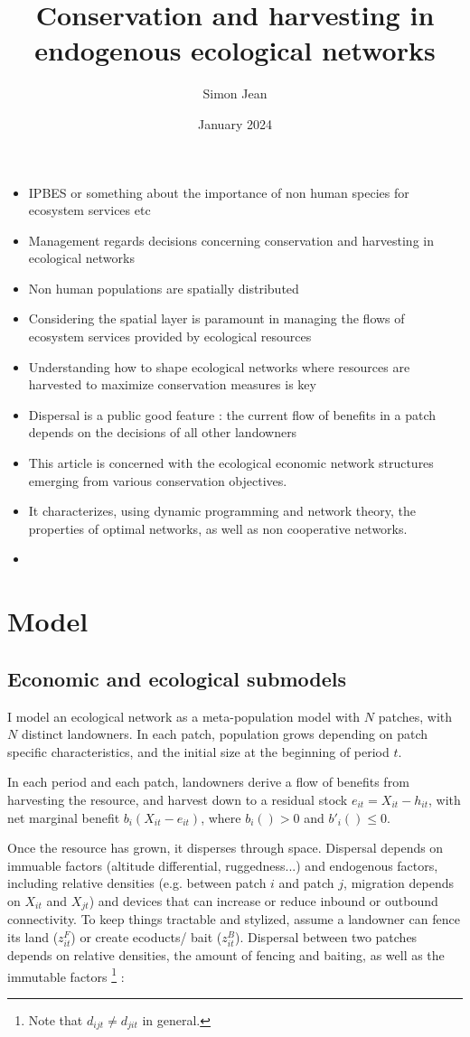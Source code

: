 \documentclass{article}
\title{Conservation and harvesting in endogenous ecological networks}
\author{Simon Jean}
\date{January 2024}
\begin{document}
\maketitle

\begin{itemize}
\item IPBES or something about the importance of non human species for ecosystem services etc
\item Management regards decisions concerning conservation and harvesting in ecological networks
\item Non human populations are spatially distributed
\item Considering the spatial layer is paramount in managing the flows of ecosystem services provided by ecological resources
\item Understanding how to shape ecological networks where resources are harvested to maximize conservation measures is key
\item Dispersal is a public good feature : the current flow of benefits in a patch depends on the decisions of all other landowners
\item This article is concerned with the ecological economic network structures emerging from various conservation objectives. 
\item It characterizes, using dynamic programming and network theory, the properties of optimal networks, as well as non cooperative networks. 
\item 
\end{itemize}


\section{Model}
\subsection{Economic and ecological submodels}
I model an ecological network as a meta-population model with $N$ patches, with $N$ distinct landowners. In each patch, population grows depending on patch specific characteristics, and the initial size at the beginning of period $t$. 

In each period and each patch, landowners derive a flow of benefits from harvesting the resource, and harvest down to a residual stock $e_{it} = X_{it}-h_{it}$, with net marginal benefit $b_i(X_{it}-e_{it})$, where $b_i()>0$ and $b'_i()\leq 0$.

 Once the resource has grown, it disperses through space. Dispersal depends on immuable factors (altitude differential, ruggedness...) and endogenous factors, including relative densities (e.g. between patch $i$ and patch $j$, migration depends on $X_{it}$ and $X_{jt}$) and devices that can increase or reduce inbound or outbound connectivity. To keep things tractable and stylized, assume a landowner can fence its land ($z_{it}^F$) or create ecoducts/ bait ($z^B_{it}$). Dispersal between two patches depends on relative densities, the amount of fencing and baiting, as well as the immutable factors \footnote{Note that $d_{ijt} \neq d_{jit}$ in general.} : 
\end{document}
